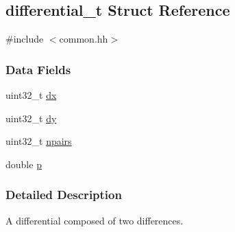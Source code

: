\hypertarget{structdifferential__t}{\subsection{differential\-\_\-t \-Struct \-Reference}
\label{structdifferential__t}
}


{\ttfamily \#include $<$common.\-hh$>$}

\subsubsection*{\-Data \-Fields}
\begin{DoxyCompactItemize}
\item 
uint32\-\_\-t \hyperlink{structdifferential__t_a7c8d9c03f003718151366dc20ebc926d}{dx}
\item 
uint32\-\_\-t \hyperlink{structdifferential__t_a23f60e1aeb235ff165e156837a7fcf0c}{dy}
\item 
uint32\-\_\-t \hyperlink{structdifferential__t_a48749d47f65b26bca18b5f43e992cc51}{npairs}
\item 
double \hyperlink{structdifferential__t_a6e5754b351ad57c5ff8a626521a5c67a}{p}
\end{DoxyCompactItemize}


\subsubsection{\-Detailed \-Description}
\-A differential composed of two differences. 

